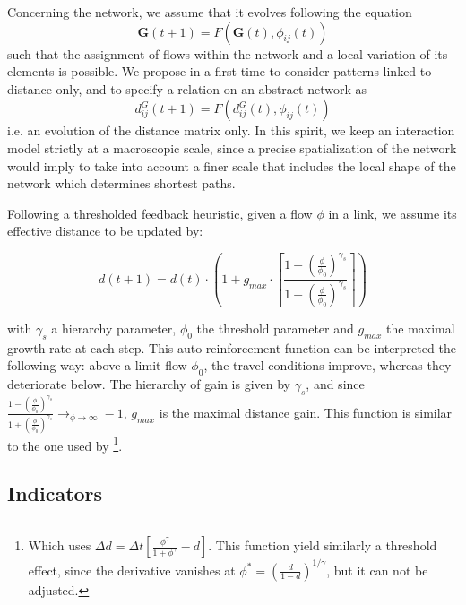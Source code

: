 Concerning the network, we assume that it evolves following the equation
\begin{equation}
\mathbf{G}(t + 1) = F(\mathbf{G}(t),\phi_{ij}(t))
\end{equation}
such that the assignment of flows within the network and a local variation of its elements is possible. We propose in a first time to consider patterns linked to distance only, and to specify a relation on an abstract network as
\begin{equation}
d^G_{ij}(t+1) = F(d^G_{ij}(t),\phi_{ij}(t))
\end{equation}
i.e. an evolution of the distance matrix only. In this spirit, we keep an interaction model strictly at a macroscopic scale, since a precise spatialization of the network would imply to take into account a finer scale that includes the local shape of the network which determines shortest paths.



Following a thresholded feedback heuristic, given a flow $\phi$ in a link, we assume its effective distance to be updated by:

\begin{equation}
d(t+1) = d(t)\cdot \left( 1 + g_{max} \cdot \left[\frac{1 - \left(\frac{\phi}{\phi_0}\right)^{\gamma_s}}{1 + \left(\frac{\phi}{\phi_0}\right)^{\gamma_s}}\right]\right)
\end{equation}

with $\gamma_s$ a hierarchy parameter, $\phi_0$ the threshold parameter and $g_{max}$ the maximal growth rate at each step. This auto-reinforcement function can be interpreted the following way: above a limit flow $\phi_0$, the travel conditions improve, whereas they deteriorate below. The hierarchy of gain is given by $\gamma_s$, and since $\frac{1 - \left(\frac{\phi}{\phi_0}\right)^{\gamma_s}}{1 + \left(\frac{\phi}{\phi_0}\right)^{\gamma_s}} \rightarrow_{\phi\rightarrow \infty} -1$, $g_{max}$ is the maximal distance gain. This function is similar to the one used by \cite{tero2007mathematical}\footnote{Which uses $\Delta d = \Delta t \left[ \frac{\phi^\gamma}{1 + \phi^\gamma} - d\right]$. This function yield similarly a threshold effect, since the derivative vanishes at $\phi^{\ast} = \left(\frac{d}{1 - d}\right)^{1/\gamma}$, but it can not be adjusted.}.



\subsection{Indicators}



